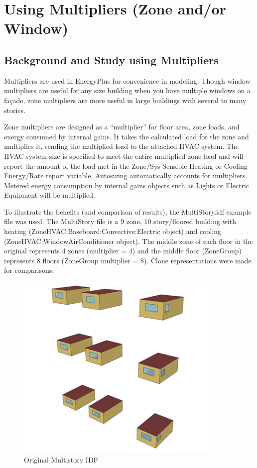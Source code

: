 \section{Using Multipliers (Zone and/or Window)}\label{using-multipliers-zone-andor-window}

\subsection{Background and Study using Multipliers}\label{background-and-study-using-multipliers}

Multipliers are used in EnergyPlus for convenience in modeling. Though window multipliers are useful for any size building when you have multiple windows on a façade, zone multipliers are more useful in large buildings with several to many stories.

Zone multipliers are designed as a ``multiplier'' for floor area, zone loads, and energy consumed by internal gains. It takes the calculated load for the zone and multiplies it, sending the multiplied load to the attached HVAC system. The HVAC system size is specified to meet the entire multiplied zone load and will report the amount of the load met in the Zone/Sys Sensible Heating or Cooling Energy/Rate report variable. Autosizing automatically accounts for multipliers. Metered energy consumption by internal gains objects such as Lights or Electric Equipment will be multiplied.

To illustrate the benefits (and comparison of results), the MultiStory.idf example file was used. The MultiStory file is a 9 zone, 10 story/floored building with heating (ZoneHVAC:Baseboard:Convective:Electric object) and cooling (ZoneHVAC:WindowAirConditioner object). The middle zone of each floor in the original represents 4 zones (multiplier = 4) and the middle floor (ZoneGroup) represents 8 floors (ZoneGroup multiplier = 8). Clone representations were made for comparisons:

\begin{figure}[hbtp] %
\centering
\includegraphics[width=0.9\textwidth, height=0.9\textheight, keepaspectratio=true]{media/image007.png}
\caption{Original Multistory IDF \protect \label{fig:original-multistory-idf}}
\end{figure}

